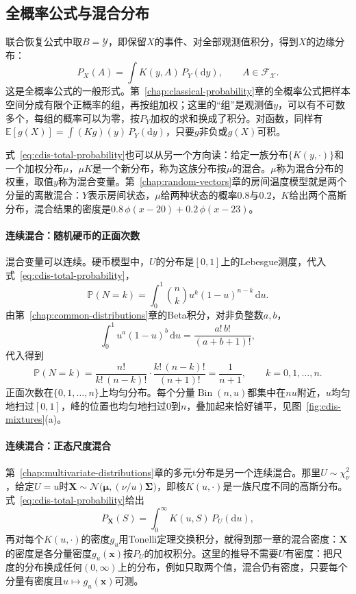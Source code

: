 \subsection{全概率公式与混合分布}
\label{sec:cdis-mixture}

联合恢复公式中取$B=\mathcal{Y}$，即保留$X$的事件、对全部观测值积分，得到$X$的边缘分布：
\begin{equation}
 P_X(A)=\int K(y,A)\,P_Y(\mathrm{d}y),\qquad A\in\mathcal{F}_{\mathcal{X}} .
 \label{eq:cdis-total-probability}
\end{equation}
这是全概率公式的一般形式。第~\ref{chap:classical-probability}章的全概率公式把样本空间分成有限个正概率的组，再按组加权；这里的“组”是观测值$y$，可以有不可数多个，每组的概率可以为零，按$P_Y$加权的求和换成了积分。对函数，同样有$\mathbb{E}[g(X)]=\int(Kg)(y)\,P_Y(\mathrm{d}y)$，只要$g$非负或$g(X)$可积。

式~\eqref{eq:cdis-total-probability}也可以从另一个方向读：给定一族分布$\{K(y,\cdot)\}$和一个加权分布$\mu$，$\mu K$是一个新分布，称为这族分布按$\mu$的混合。$\mu$称为混合分布的权重，取值$y$称为混合变量。第~\ref{chap:random-vectors}章的房间温度模型就是两个分量的离散混合：$Y$表示房间状态，$\mu$给两种状态的概率$0.8$与$0.2$，$K$给出两个高斯分布，混合结果的密度是$0.8\,\phi(x-20)+0.2\,\phi(x-23)$。

\paragraph{连续混合：随机硬币的正面次数}
混合变量可以连续。硬币模型中，$U$的分布是$[0,1]$上的Lebesgue测度，代入式~\eqref{eq:cdis-total-probability}，
\[
 \mathbb{P}(N=k)=\int_0^1\binom nk u^{k}(1-u)^{n-k}\,\mathrm{d}u .
\]
由第~\ref{chap:common-distributions}章的Beta积分，对非负整数$a,b$，
\[
 \int_0^1u^{a}(1-u)^{b}\,\mathrm{d}u=\frac{a!\,b!}{(a+b+1)!},
\]
代入得到
\[
 \mathbb{P}(N=k)=\frac{n!}{k!\,(n-k)!}\cdot\frac{k!\,(n-k)!}{(n+1)!}=\frac{1}{n+1},\qquad k=0,1,\dots,n .
\]
正面次数在$\{0,1,\dots,n\}$上均匀分布。每个分量$\operatorname{Bin}(n,u)$都集中在$nu$附近，$u$均匀地扫过$[0,1]$，峰的位置也均匀地扫过$0$到$n$，叠加起来恰好铺平，见图~\ref{fig:cdis-mixtures}(a)。

\paragraph{连续混合：正态尺度混合}
第~\ref{chap:multivariate-distributions}章的多元t分布是另一个连续混合。那里$U\sim\chi^{2}_{\nu}$，给定$U=u$时$\bm{X}\sim\mathcal{N}\bigl(\bm{\mu},(\nu/u)\bm{\Sigma}\bigr)$，即核$K(u,\cdot)$是一族尺度不同的高斯分布。式~\eqref{eq:cdis-total-probability}给出
\[
 P_{\bm{X}}(S)=\int_0^{\infty}K(u,S)\,P_U(\mathrm{d}u),
\]
再对每个$K(u,\cdot)$的密度$g_u$用Tonelli定理交换积分，就得到那一章的混合密度：$\bm{X}$的密度是各分量密度$g_u(\bm{x})$按$P_U$的加权积分。这里的推导不需要$U$有密度：把尺度的分布换成任何$(0,\infty)$上的分布，例如只取两个值，混合仍有密度，只要每个分量有密度且$u\mapsto g_u(\bm{x})$可测。

